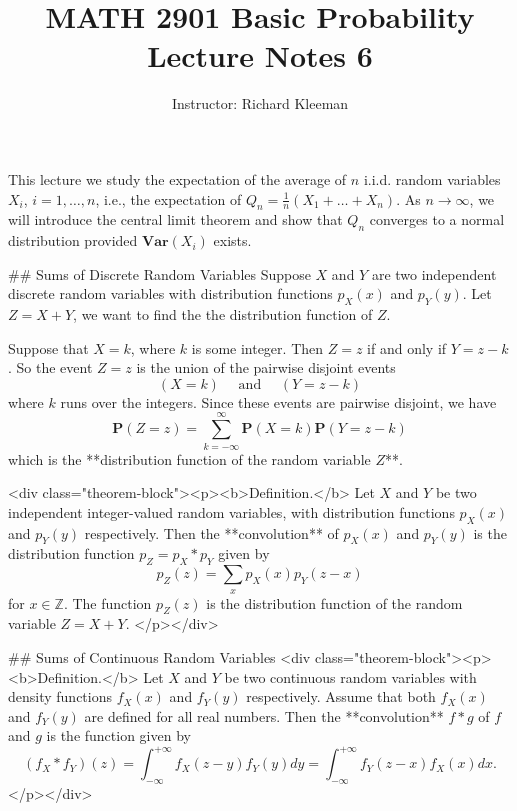 


\title{MATH 2901 Basic Probability Lecture Notes 6}
\author{Instructor: Richard Kleeman}
\date{}
\maketitle


This lecture we study the expectation of the average of $n$ i.i.d. random variables $X_i$, $i=1,\dots, n$, i.e., the expectation of $Q_n = \frac{1}{n} (X_1 + \dots + X_n)$. As $n \to \infty$, we will introduce the central limit theorem and show that $Q_n$ converges to a normal distribution provided $\mathbf{Var}(X_i)$ exists.


## Sums of Discrete Random Variables
Suppose $X$ and $Y$ are two independent discrete random variables with distribution functions $p_X(x)$ and $p_Y(y)$. Let $Z = X + Y$, we want to find the the distribution function of $Z$. 

Suppose that $X = k$, where $k$ is some integer. Then $Z = z$ if and only if $Y = z-k$. So the event $Z = z$ is the union of the pairwise disjoint events
$$\begin{equation}
    (X=k) \quad  \text { and } \quad  (Y=z-k)
\end{equation}$$
where $k$ runs over the integers. Since these events are pairwise disjoint, we have
$$$$\begin{equation}
    \label{eq:6.1}
    \tag{6-1}
    \mathbf{P}(Z=z)=\sum_{k=-\infty}^{\infty} \mathbf{P}(X=k)  \mathbf{P}(Y=z-k)
\end{equation}$$$$
which is the **distribution function of the random variable $Z$**.

<div class="theorem-block"><p><b>Definition.</b> 
Let $X$ and $Y$ be two independent integer-valued random variables, with distribution functions $p_X(x)$ and $p_Y(y)$ respectively. Then the **convolution** of $p_X(x)$ and $p_Y(y)$ is the distribution function $p_Z = p_X * p_Y$ given by
$$\begin{equation}
    p_Z(z) = \sum_{x} p_X(x) p_Y(z-x)
\end{equation}$$
for $x\in \mathbb{Z}$. The function $p_Z(z)$ is the distribution function of the random variable $Z = X + Y$.
</p></div>


## Sums of Continuous Random Variables
<div class="theorem-block"><p><b>Definition.</b> 
Let $X$ and $Y$ be two continuous random variables with density functions $f_X(x)$ and $f_Y(y)$ respectively. Assume that both $f_X(x)$ and $f_Y(y)$ are defined for all real numbers. Then the **convolution** $f * g$ of $f$ and $g$ is the function given by
$$$$\begin{equation}
    \label{eq:6.2}
    \tag{6-2}
    (f_X * f_Y)(z) = \int_{-\infty}^{+\infty} f_X(z-y) f_Y(y) d y = \int_{-\infty}^{+\infty} f_Y(z-x) f_X(x) d x.
\end{equation}$$$$
</p></div>

